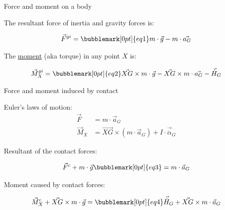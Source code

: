 \documentclass[compress]{beamer}
\begin{document}
\begin{frame}{Force and moment on a body}

        The resultant force of inertia and gravity forces is:

            \[
                \vec{F}^{gi} =\bubblemark[0pt]{eq1} m\cdot \vec{g} - m\cdot \vec{a_G}
            \]

            \vspace{5em}
        The \href{http://en.wikipedia.org/wiki/Moment_of_force}{moment} (aka
            torque) in any point $X$ is:

            \[
                \vec{M}^{gi}_X =\bubblemark[0pt]{eq2} \vec{XG} \times m\cdot \vec{g} - \vec{XG} \times m\cdot \vec{a_G} - \vec{\dot{H}}_G
            \]




\end{frame}

\begin{frame}{Force and moment induced by contact}

        Euler's laws of motion:
        \begin{align*}
            \vec{F} &= m\cdot \vec{a}_G \\
            \vec{M}_X &= \vec{XG} \times (m\cdot \vec{a}_G) + I\cdot \vec{\ddot\alpha}_G
        \end{align*}

        \pause

        Resultant of the contact forces:

            \[
                \vec{F}^c + m\cdot \vec{g}\bubblemark[0pt]{eq3} = m\cdot \vec{a}_G
            \]


        Moment caused by contact forces:

            \[
                \vec{M}_X^c + \vec{XG} \times m\cdot \vec{g} =\bubblemark[0pt]{eq4} \vec{\dot{H}}_G + \vec{XG} \times m\cdot \vec{a}_G
            \]




\end{frame}
\end{document}
